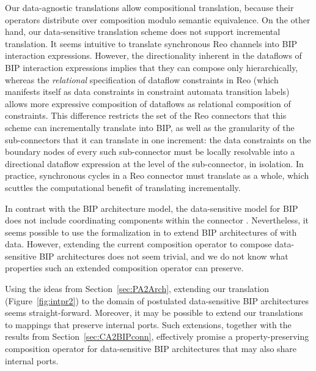 \documentclass[submission,copyright,creativecommons,hidelinks]{eptcs}
\theoremstyle{plain} \newtheorem{theorem}{Theorem}
\theoremstyle{definition}
\theoremstyle{remark}
\newcommand{\fig}[2][]{Figure~\ref{fig:#2}\ensuremath{#1}}
\newcommand{\secn}[1]{Section~\ref{sec:#1}}
\begin{document}
Our data-agnostic translations allow compositional translation, because their operators distribute over composition modulo semantic equivalence.
On the other hand, our data-sensitive translation scheme does not support incremental translation.
It seems intuitive to translate synchronous Reo channels into BIP interaction expressions. 
However, the directionality inherent in the dataflows of BIP interaction expressions implies that they can compose only hierarchically, whereas the \emph{relational} specification of dataflow constraints in Reo (which manifests itself as data constraints in constraint automata transition labels) allows more expressive composition of dataflows as relational composition of constraints.
This difference restricts the set of the Reo connectors that this scheme can incrementally translate into BIP, as well as the granularity of the sub-connectors that it can translate in one increment: the data constraints on the boundary nodes of every such sub-connector must be locally resolvable into a directional dataflow expression at the level of the sub-connector, in isolation.
In practice, synchronous cycles in a Reo connector must translate as a whole, which scuttles the computational benefit of translating incrementally.

In contrast with the BIP architecture model, the data-sensitive model for BIP does not include coordinating components within the connector \cite{ABBJS14, BBJS14}.
Nevertheless, it seems possible to use the formalization in \cite{BBJS14} to extend BIP architectures of \cite{ABBJS14} with data.
However, extending the current composition operator  to compose data-sensitive BIP architectures does not seem trivial, and we do not know what properties such an extended composition operator can preserve. 

Using the ideas from \secn{PA2Arch}, extending our  translation (\fig{intpr2}) to the domain of postulated data-sensitive BIP architectures seems straight-forward. 
Moreover, it may be possible to extend our translations to mappings that preserve internal ports.  
Such extensions, together with the results from \secn{CA2BIPconn}, effectively promise a property-preserving composition operator for data-sensitive BIP architectures that may also share internal ports.



\end{document}
